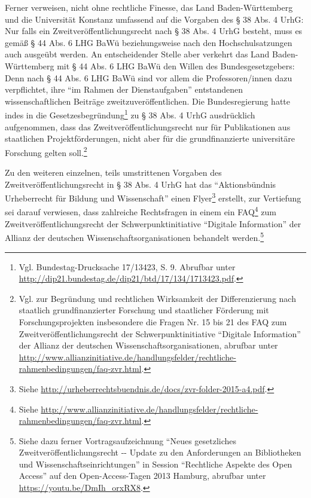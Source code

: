 \documentclass[a4paper,
fontsize=11pt,
oneside,
numbers=noperiodatend,
parskip=half-,
bibliography=totoc,
final
]{scrartcl}
\begin{document}
Ferner verweisen, nicht ohne rechtliche Finesse, das Land
Baden-Württemberg und die Universität Konstanz umfassend auf die
Vorgaben des § 38 Abs. 4 UrhG: Nur falls ein Zweit\-ver\-öffent\-lich\-ungs\-recht
nach § 38 Abs. 4 UrhG besteht, muss es gemäß § 44 Abs. 6 LHG BaWü
beziehungsweise nach den Hochschulsatzungen auch ausgeübt werden. An
entscheidender Stelle aber verkehrt das Land Baden-Württemberg mit § 44
Abs. 6 LHG BaWü den Willen des Bundesgesetzgebers: Denn nach § 44 Abs. 6
LHG BaWü sind vor allem die Professoren/innen dazu verpflichtet, ihre
\enquote{im Rahmen der Dienstaufgaben} entstandenen wissenschaftlichen
Beiträge zweitzuveröffentlichen. Die Bundesregierung hatte indes in die
Gesetzesbegründung\footnote{Vgl. Bundestag-Drucksache 17/13423, S. 9.
  Abrufbar unter
  \url{http://dip21.bundestag.de/dip21/btd/17/134/1713423.pdf}.} zu § 38
Abs. 4 UrhG ausdrücklich aufgenommen, dass das
Zweit\-ver\-öffent\-lich\-ungs\-recht nur für Publikationen aus staatlichen
Projektförderungen, nicht aber für die grundfinanzierte universitäre
Forschung gelten soll.\footnote{Vgl. zur Begründung und rechtlichen
  Wirksamkeit der Differenzierung nach staatlich grundfinanzierter
  Forschung und staatlicher Förderung mit Forschungsprojekten
  insbesondere die Fragen Nr. 15 bis 21 des FAQ zum
  Zweit\-ver\-öffent\-lich\-ungs\-recht der Schwerpunktinitiative
  \enquote{Digitale Information} der Allianz der deutschen
  Wissenschaftsorganisationen, abrufbar unter
  \url{http://www.allianzinitiative.de/handlungsfelder/rechtliche-rahmenbedingungen/faq-zvr.html}.}

Zu den weiteren einzelnen, teils umstrittenen Vorgaben des
Zweit\-ver\-öffent\-lich\-ungs\-recht in § 38 Abs. 4 UrhG hat das
\enquote{Aktionsbündnis Urheberrecht für Bildung und Wissenschaft} einen
Flyer\footnote{Siehe
  \url{http://urheberrechtsbuendnis.de/docs/zvr-folder-2015-a4.pdf}.}
erstellt, zur Vertiefung sei darauf verwiesen, dass zahlreiche
Rechtsfragen in einem ein FAQ\footnote{Siehe
  \url{http://www.allianzinitiative.de/handlungsfelder/rechtliche-rahmenbedingungen/faq-zvr.html}.}
zum Zweit\-ver\-öffent\-lich\-ungs\-recht der Schwerpunktinitiative
\enquote{Digitale Information} der Allianz der deutschen
Wissenschaftsorganisationen behandelt werden.\footnote{Siehe dazu ferner
  Vortragsaufzeichnung \enquote{Neues gesetzliches
  Zweit\-ver\-öffent\-lich\-ungs\-recht -\/- Update zu den Anforderungen an
  Bibliotheken und Wissenschaftseinrichtungen} in Session
  \enquote{Rechtliche Aspekte des Open Access} auf den Open-Access-Tagen
  2013 Hamburg, abrufbar unter \url{https://youtu.be/DmIh_orxRX8}.}
\end{document}
